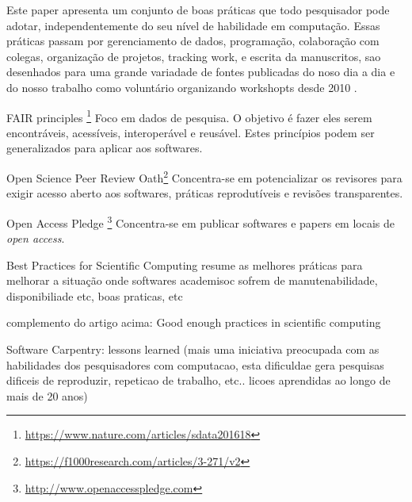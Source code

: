 


Este paper
apresenta um conjunto de boas práticas que todo pesquisador pode adotar,
independentemente do seu nível de habilidade em computação. Essas práticas
passam por gerenciamento de dados, programação, colaboração com colegas,
organização de projetos, tracking work, e escrita da manuscritos, sao
desenhados para uma grande variadade de fontes publicadas do noso dia a dia e
do nosso trabalho como voluntário organizando workshopts desde 2010
\cite{wilson2017good}.

FAIR principles \cite{wilkinson2016fair}\footnote{\url{https://www.nature.com/articles/sdata201618}}
Foco em dados de pesquisa. O objetivo é fazer eles serem encontráveis,
acessíveis, interoperável e reusável. Estes princípios podem ser
generalizados para aplicar aos softwares.

Open Science Peer Review Oath\footnote{\url{https://f1000research.com/articles/3-271/v2}}
Concentra-se em potencializar os revisores para exigir acesso aberto aos
softwares, práticas reprodutíveis e revisões transparentes.

Open Access Pledge \cite{holcombe2011openaccess}\footnote{\url{http://www.openaccesspledge.com}}
Concentra-se em publicar softwares e papers em locais de {\it open access}.

Best Practices for Scientific Computing \cite{wilson2014best}
resume as melhores práticas para melhorar a situação onde softwares
academisoc sofrem de manutenabilidade, disponibiliade etc, boas praticas, etc

complemento do artigo acima: 
Good enough practices in scientific computing \cite{wilson2017good}

Software Carpentry: lessons learned \cite{wilson2014software}
(mais uma iniciativa preocupada com as habilidades dos pesquisadores
com computacao, esta dificuldae gera pesquisas dificeis de reproduzir,
repeticao de trabalho, etc.. licoes aprendidas ao longo de mais de 20 anos)

